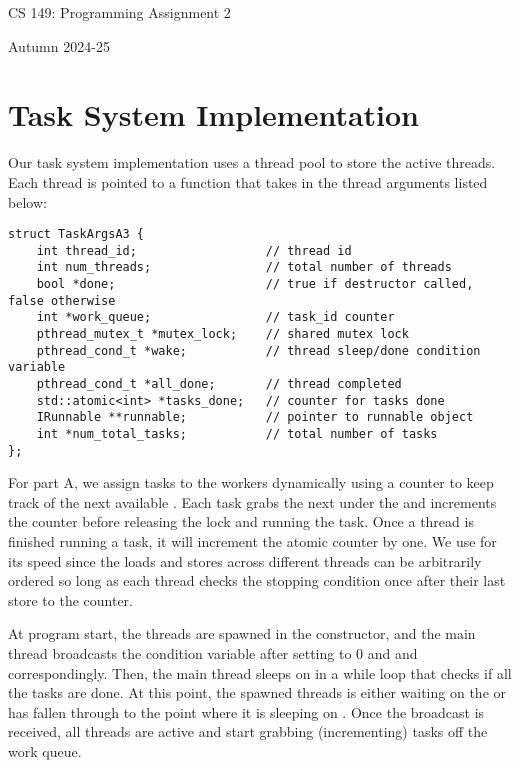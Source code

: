 \documentclass[11pt]{article}
\begin{document}
\lstset{language=C++,basicstyle=\footnotesize\ttfamily,breaklines=true}

\fancyhf{}
\setlength{\headheight}{14pt}
\pagestyle{fancy}

\centerline{\Large CS 149: Programming Assignment 2}
\centerline{Autumn 2024-25}

\section{Task System Implementation}

Our task system implementation uses a thread pool to store the active threads.
Each thread is pointed to a  function that takes in the
thread arguments listed below:
\begin{lstlisting}
struct TaskArgsA3 {
    int thread_id;                  // thread id
    int num_threads;                // total number of threads
    bool *done;                     // true if destructor called, false otherwise
    int *work_queue;                // task_id counter
    pthread_mutex_t *mutex_lock;    // shared mutex lock
    pthread_cond_t *wake;           // thread sleep/done condition variable
    pthread_cond_t *all_done;       // thread completed 
    std::atomic<int> *tasks_done;   // counter for tasks done
    IRunnable **runnable;           // pointer to runnable object
    int *num_total_tasks;           // total number of tasks
};
\end{lstlisting}

For part A, we assign tasks to the workers dynamically using a 
counter to keep track of the next available . Each task grabs the
next  under the  and increments the counter
before releasing the lock and running the task. Once a thread is finished
running a task, it will increment the atomic  counter by one.
We use  for its speed since the loads and
stores across different threads can be arbitrarily ordered so long as each
thread checks the stopping condition once after their last store to the counter.

At program start, the threads are spawned in the constructor, and the main
thread broadcasts the  condition variable after setting
 to 0 and  and 
correspondingly. Then, the main thread sleeps on  in a while loop
that checks if all the tasks are done. At this point, the spawned threads is either
waiting on the  or has fallen through to the point where it is
sleeping on . Once the broadcast is received, all threads are active
and start grabbing (incrementing) tasks off the work queue.
\end{document}
